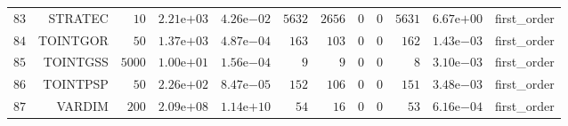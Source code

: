 \begin{longtable}{rrrrrrrrrrrr}
  \(    83\) & STRATEC & \(    10\) & \( 2.21\)e\(+03\) & \( 4.26\)e\(-02\) & \(  5632\) & \(  2656\) & \(     0\) & \(     0\) & \(  5631\) & \( 6.67\)e\(+00\) & first\_order \\
  \(    84\) & TOINTGOR & \(    50\) & \( 1.37\)e\(+03\) & \( 4.87\)e\(-04\) & \(   163\) & \(   103\) & \(     0\) & \(     0\) & \(   162\) & \( 1.43\)e\(-03\) & first\_order \\
  \(    85\) & TOINTGSS & \(  5000\) & \( 1.00\)e\(+01\) & \( 1.56\)e\(-04\) & \(     9\) & \(     9\) & \(     0\) & \(     0\) & \(     8\) & \( 3.10\)e\(-03\) & first\_order \\
  \(    86\) & TOINTPSP & \(    50\) & \( 2.26\)e\(+02\) & \( 8.47\)e\(-05\) & \(   152\) & \(   106\) & \(     0\) & \(     0\) & \(   151\) & \( 3.48\)e\(-03\) & first\_order \\
  \(    87\) & VARDIM & \(   200\) & \( 2.09\)e\(+08\) & \( 1.14\)e\(+10\) & \(    54\) & \(    16\) & \(     0\) & \(     0\) & \(    53\) & \( 6.16\)e\(-04\) & first\_order \\\hline
\end{longtable}
